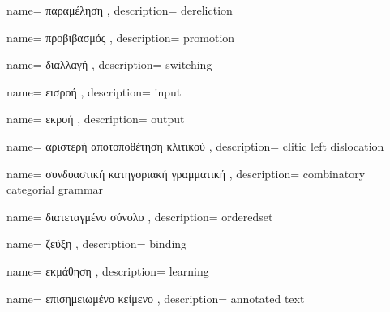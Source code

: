 {name={
παραμέληση
},
description={
dereliction
}}

{name={
προβιβασμός
},
description={
promotion
}}

{name={
διαλλαγή
},
description={
switching
}}

{name={
εισροή
},
description={
input
}}

{name={
εκροή
},
description={
output
}}

{name={
αριστερή αποτοποθέτηση κλιτικού
},
description={
clitic left
dislocation
}}

{name={
συνδυαστική κατηγοριακή γραμματική
},
description={
combinatory categorial grammar
}}

{name={
διατεταγμένο σύνολο
},
description={
orderedset
}}

{name={
ζεύξη
},
description={
binding
}}

{name={
εκμάθηση
},
description={
learning
}}

{name={
επισημειωμένο κείμενο
},
description={
annotated text
}}


